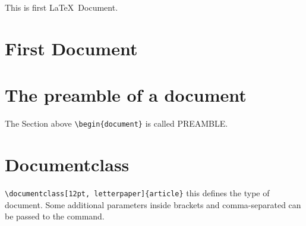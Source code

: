 \documentclass{article}
\begin{document}
This is first \LaTeX\ Document. 

\section{First Document}


\section{The preamble of a document} 
The Section above
 \verb|\begin{document}| is called PREAMBLE.

\section{Documentclass}
\verb|\documentclass[12pt, letterpaper]{article}|
this defines the type of document. Some additional parameters inside brackets and comma-separated can be passed to the command.
\end{document}
